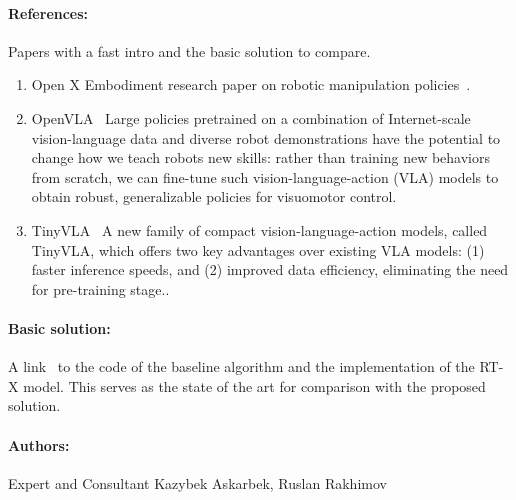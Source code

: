 \documentclass[12pt]{article}
\begin{document}
\paragraph{References:} Papers with a fast intro and the basic solution to compare.
\begin{enumerate}
    \item Open X Embodiment research paper on robotic manipulation policies~\cite{Padalkar2023OpenXR}.
    \item OpenVLA~\cite{Kim2024OpenVLAAO} Large policies pretrained on a combination of Internet-scale vision-language data and diverse robot demonstrations have the potential to change how we teach robots new skills: rather than training new behaviors from scratch, we can fine-tune such vision-language-action (VLA) models to obtain robust, generalizable policies for visuomotor control.
    \item TinyVLA~\cite{Wen2024TinyVLATF} A new family of compact vision-language-action models, called TinyVLA, which offers two key advantages over existing VLA models: (1) faster inference speeds, and (2) improved data efficiency, eliminating the need for pre-training stage..
\end{enumerate}

\paragraph{Basic solution:} A link~\cite{Padalkar2023OpenXR} to the code of the baseline algorithm and the implementation of the RT-X model. This serves as the state of the art for comparison with the proposed solution.

\paragraph{Authors:} Expert and Consultant
Kazybek Askarbek, Ruslan Rakhimov
\end{document}

